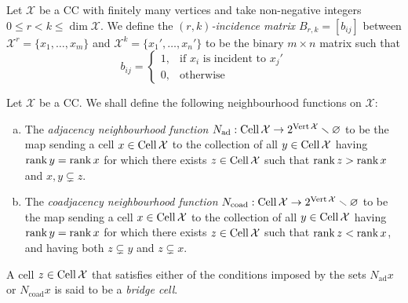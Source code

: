 \begin{definition}
\label{def:cc-incidence-matrix}
Let \(\mathcal{X}\) be a CC with finitely many vertices and take non-negative integers
\(0 \leq r < k \leq \dim \mathcal{X}\). We define the \emph{\((r, k)\)-incidence matrix
  \(B_{r, k} = [b_{i j}]\)} between \(\mathcal{X}^r = \{x_1, \dots, x_m\}\) and
\(\mathcal{X}^k = \{x_1', \dots, x_n'\}\) to be the binary \(m \times n\) matrix such that
\[
b_{i j} =
\begin{cases}
  1, &\text{if } x_i \text{ is incident to } x_j' \\
  0, &\text{otherwise}
\end{cases}
\]
\end{definition}

\begin{definition}
\label{def:co-adjacency-neighbourhood-function}
Let \(\mathcal{X}\) be a CC. We shall define the following neighbourhood functions on \(\mathcal{X}\):
\begin{enumerate}[(a)]\setlength\itemsep{0em}
\item The \emph{adjacency neighbourhood function}
  \(N_{\text{ad}}: \operatorname{Cell} \mathcal{X} \to 2^{\operatorname{Vert} \mathcal X} \smallsetminus \varnothing\) to be the map sending
  a cell \(x \in \operatorname{Cell} \mathcal{X}\) to the collection of all
  \(y \in \operatorname{Cell} \mathcal{X}\) having \(\operatorname{rank} y = \operatorname{rank} x\) for which there exists
  \(z \in \operatorname{Cell} \mathcal{X}\) such that \(\operatorname{rank} z > \operatorname{rank} x\) and \(x, y \subsetneq z\).

\item The \emph{coadjacency neighbourhood function}
  \(N_{\text{coad}}: \operatorname{Cell} \mathcal{X} \to 2^{\operatorname{Vert} \mathcal X} \smallsetminus \varnothing\) to be the map sending
  a cell \(x \in \operatorname{Cell} \mathcal{X}\) to the collection of all
  \(y \in \operatorname{Cell} \mathcal{X}\) having \(\operatorname{rank} y = \operatorname{rank} x\) for which there exists
  \(z \in \operatorname{Cell} \mathcal{X}\) such that \(\operatorname{rank} z < \operatorname{rank} x\), and having both \(z \subsetneq y\) and
  \(z \subsetneq x\).
\end{enumerate}
A cell \(z \in \operatorname{Cell} \mathcal{X}\) that satisfies either of the conditions imposed by the
sets \(N_{\text{ad}} x\) or \(N_{\text{coad}} x\) is said to be a \emph{bridge cell}.
\end{definition}



